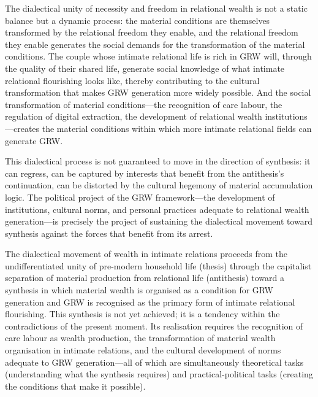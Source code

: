 The dialectical unity of necessity and freedom in relational wealth is not a static balance but a dynamic process: the material conditions are themselves transformed by the relational freedom they enable, and the relational freedom they enable generates the social demands for the transformation of the material conditions. The couple whose intimate relational life is rich in GRW will, through the quality of their shared life, generate social knowledge of what intimate relational flourishing looks like, thereby contributing to the cultural transformation that makes GRW generation more widely possible. And the social transformation of material conditions---the recognition of care labour, the regulation of digital extraction, the development of relational wealth institutions---creates the material conditions within which more intimate relational fields can generate GRW.

This dialectical process is not guaranteed to move in the direction of synthesis: it can regress, can be captured by interests that benefit from the antithesis's continuation, can be distorted by the cultural hegemony of material accumulation logic. The political project of the GRW framework---the development of institutions, cultural norms, and personal practices adequate to relational wealth generation---is precisely the project of sustaining the dialectical movement toward synthesis against the forces that benefit from its arrest.

\begin{claim}
The dialectical movement of wealth in intimate relations proceeds from the undifferentiated unity of pre-modern household life (thesis) through the capitalist separation of material production from relational life (antithesis) toward a synthesis in which material wealth is organised as a condition for GRW generation and GRW is recognised as the primary form of intimate relational flourishing. This synthesis is not yet achieved; it is a tendency within the contradictions of the present moment. Its realisation requires the recognition of care labour as wealth production, the transformation of material wealth organisation in intimate relations, and the cultural development of norms adequate to GRW generation---all of which are simultaneously theoretical tasks (understanding what the synthesis requires) and practical-political tasks (creating the conditions that make it possible).
\end{claim}
